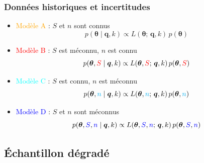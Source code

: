 \documentclass[compress,9pt]{beamer}
\begin{document}
	\begin{frame}
	\frametitle{Données historiques et incertitudes}
		\begin{itemize}
			\item<1-> \textcolor{orange}{Modèle A} : $S$ et $n$ sont connus
			\begin{equation}
						p(\boldsymbol{\theta} \mid \boldsymbol{q},k) \propto L(\boldsymbol{\theta};\,\boldsymbol{q},k) \, p(\boldsymbol{\theta})
			\end{equation}		
			\vfill
			\item<2-> \textcolor{red}{Modèle B} : $S$ est méconnu, $n$ est connu
			\begin{equation}
						p(\boldsymbol{\theta},\textcolor{red}{S} \mid \boldsymbol{q},k) \propto L(\boldsymbol{\theta},\textcolor{red}{S};\,\boldsymbol{q},k) \, p(\boldsymbol{\theta},\textcolor{red}{S})
			\end{equation}		
			\vfill
			\item<3-> \textcolor{cyan}{Modèle C} : $S$ est connu, $n$ est méconnu
			\begin{equation}
						p(\boldsymbol{\theta},\textcolor{cyan}{n} \mid \boldsymbol{q},k) \propto L(\boldsymbol{\theta},\textcolor{cyan}{n};\,\boldsymbol{q},k) \, p(\boldsymbol{\theta},\textcolor{cyan}{n})
			\end{equation}		
			\vfill
			\item<4-> \textcolor{blue}{Modèle D} : $S$ et $n$ sont méconnus
			\begin{equation}
						p(\boldsymbol{\theta},\textcolor{blue}{S},\textcolor{blue}{n} \mid \boldsymbol{q},k) \propto L(\boldsymbol{\theta},\textcolor{blue}{S},\textcolor{blue}{n};\,\boldsymbol{q},k) \, p(\boldsymbol{\theta},\textcolor{blue}{S},\textcolor{blue}{n})
			\end{equation}		
		\end{itemize}			
	\end{frame}		

\subsection{Échantillon dégradé}
	
\end{document}
